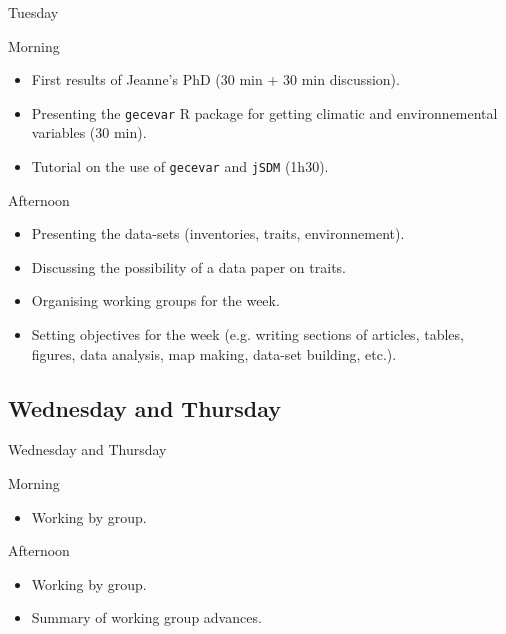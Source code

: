 \documentclass[10pt,table,dvipsnames,compress]{beamer}
\begin{document}
\begin{frame}[label={sec:org5464612},fragile]{Tuesday}
 \begin{block}{Morning}
\begin{itemize}
\item First results of Jeanne's PhD (30 min + 30 min discussion).
\item Presenting the \texttt{gecevar} R package for getting climatic and environnemental variables (30 min).
\item Tutorial on the use of \texttt{gecevar} and \texttt{jSDM} (1h30).
\end{itemize}
\end{block}

\begin{block}{Afternoon}
\begin{itemize}
\item Presenting the data-sets (inventories, traits, environnement).
\item Discussing the possibility of a data paper on traits.
\item Organising working groups for the week.
\item Setting objectives for the week (e.g. writing sections of articles, tables, figures, data analysis, map making, data-set building, etc.).
\end{itemize}
\end{block}
\end{frame}

\subsection{Wednesday and Thursday}
\label{sec:orgd34a03a}

\begin{frame}[label={sec:org0049491}]{Wednesday and Thursday}
\begin{block}{Morning}
\begin{itemize}
\item Working by group.
\end{itemize}
\end{block}
\begin{block}{Afternoon}
\begin{itemize}
\item Working by group.
\item Summary of working group advances.
\end{itemize}
\end{block}
\end{frame}
\end{document}
